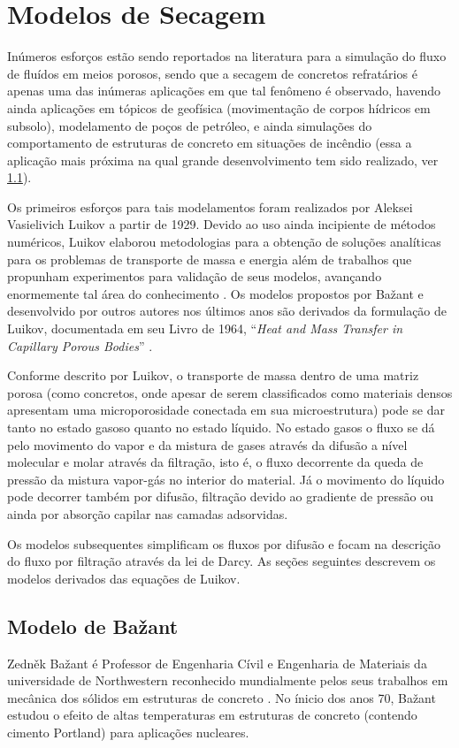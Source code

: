 \section{Modelos de Secagem}\label{modelos}
Inúmeros esforços estão sendo reportados na literatura para a simulação do fluxo
de fluídos em meios porosos, sendo que a secagem de concretos refratários é apenas uma das
inúmeras aplicações em que tal fenômeno é observado, havendo ainda
aplicações em tópicos de geofísica (movimentação de corpos hídricos em subsolo),
modelamento de poços de petróleo, e ainda simulações do comportamento de
estruturas de concreto em situações de incêndio (essa a aplicação mais próxima
na qual grande desenvolvimento tem sido realizado, ver \ref{sec:bazant}).


Os primeiros esforços para tais modelamentos foram realizados por Aleksei
Vasielivich Luikov \cite{martynenko2010} a partir de 1929. Devido ao uso ainda
incipiente de métodos numéricos, Luikov elaborou metodologias para a obtenção de
soluções analíticas para os problemas de transporte de massa e energia além de
trabalhos que propunham experimentos para validação de seus modelos, avançando
enormemente tal área do conhecimento \cite{Mikhailov1983}. Os modelos propostos
por Ba\v{z}ant e desenvolvido por outros autores nos últimos anos são derivados da
formulação de Luikov, documentada em seu Livro de 1964, ``\textit{Heat and Mass
  Transfer in Capillary Porous Bodies}'' \cite{luikov1964heat}.

Conforme descrito por Luikov, o transporte de massa dentro de uma matriz porosa
(como concretos, onde apesar de serem classificados como materiais densos
apresentam uma microporosidade conectada em sua microestrutura)
pode se dar tanto no estado gasoso quanto no estado líquido. No estado gasos o
fluxo se dá pelo movimento do vapor e da mistura de gases através da difusão a
nível molecular e molar através da filtração, isto é, o fluxo decorrente
da queda de pressão da mistura vapor-gás no interior do material. Já o movimento
do líquido pode decorrer também por difusão, filtração devido ao gradiente de
pressão ou ainda por absorção capilar nas camadas adsorvidas.

Os modelos subsequentes simplificam os fluxos por difusão e focam na descrição
do fluxo por filtração através da lei de Darcy. As seções seguintes descrevem os
modelos derivados das equações de Luikov.
    
    
\subsection{Modelo de Ba\v{z}ant}\label{sec:bazant}
Zedn\v{e}k Ba\v{z}ant é Professor de Engenharia Cívil e Engenharia de Materiais
da universidade de Northwestern reconhecido mundialmente pelos seus trabalhos em
mecânica dos sólidos em estruturas de concreto \cite{bundesen2004biography}. No
ínicio dos anos 70, Ba\v{z}ant estudou o efeito de altas temperaturas em
estruturas de concreto (contendo cimento Portland) para aplicações nucleares.
    
